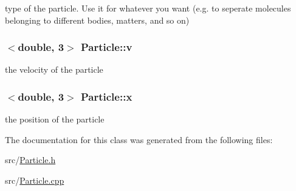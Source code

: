 type of the particle. Use it for whatever you want (e.\-g. to seperate molecules belonging to different bodies, matters, and so on) \hypertarget{classParticle_ac3669e50d83d8608d522965b9acd1d8b}{
\subsubsection[{v}]{$<$double, 3$>$ Particle\-::v\hspace{0.3cm}{\ttfamily [private]}}}\label{classParticle_ac3669e50d83d8608d522965b9acd1d8b}
the velocity of the particle \hypertarget{classParticle_a3789900d6fe19a75d3a82cd5e9622c4c}{
\subsubsection[{x}]{$<$double, 3$>$ Particle\-::x\hspace{0.3cm}{\ttfamily [private]}}}\label{classParticle_a3789900d6fe19a75d3a82cd5e9622c4c}
the position of the particle 

The documentation for this class was generated from the following files\-:\begin{DoxyCompactItemize}
\item 
src/\hyperlink{Particle_8h}{Particle.\-h}\item 
src/\hyperlink{Particle_8cpp}{Particle.\-cpp}\end{DoxyCompactItemize}

